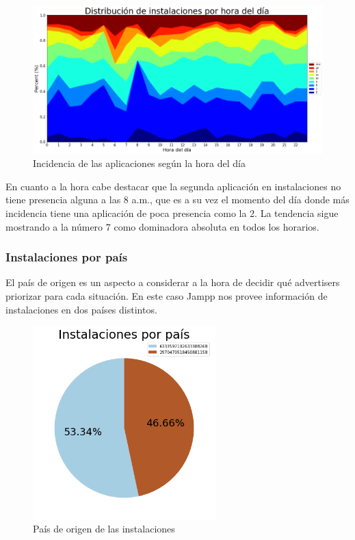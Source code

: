 \documentclass[a4paper, 12pt]{article}
\begin{document}
		\FloatBarrier
		\begin{figure}[h]
			\centering
			\includegraphics[width=\textwidth]{images/installs/appsxhora.png}
			\caption{Incidencia de las aplicaciones según la hora del día}
		\end{figure}
		\FloatBarrier

		En cuanto a la hora cabe destacar que la segunda aplicación en instalaciones no tiene presencia alguna a las 8 a.m., que es a su vez el momento del día donde más incidencia tiene una aplicación de poca presencia como la 2. La tendencia sigue mostrando a la número 7 como dominadora absoluta en todos los horarios.

	\subsubsection{Instalaciones por país}
		El país de origen es un aspecto a considerar a la hora de decidir qué advertisers priorizar para cada situación. En este caso Jampp nos provee información de instalaciones en dos países distintos.

		\FloatBarrier
		\begin{figure}[h]
			\centering
			\includegraphics[width=200pt]{images/installs/piechartpaises.png}
			\caption{País de origen de las instalaciones}
		\end{figure}
		\FloatBarrier
\end{document}
